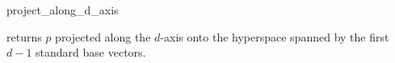 \begin{ccRefFunction}{project_along_d_axis}

{returns $p$ projected along the $d$-axis onto the hyperspace spanned
  by the first $d-1$ standard base vectors.}

\end{ccRefFunction}

